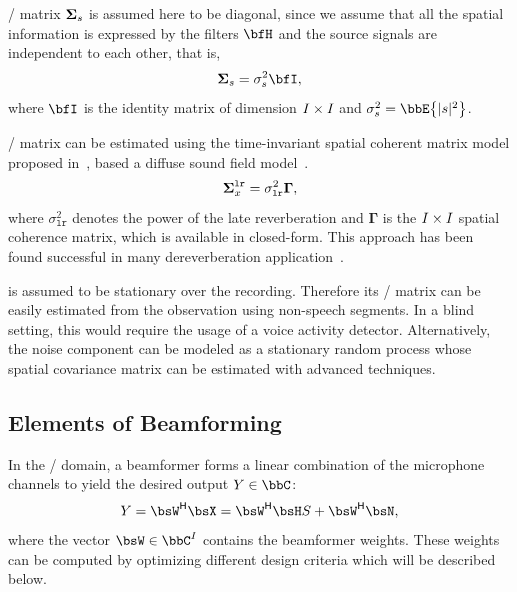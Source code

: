  \PSD/ matrix $\boldsymbol{\Sigma}_{s}$ is assumed here to be diagonal, since we assume that all the spatial information is expressed by the filters $\FLTSS$ and the source signals are independent to each other, that is,
\begin{equation}
    \xpsd_\src = \sigma_\src^2 \bfI
    ,
\end{equation}
where $\bfI$ is the identity matrix of dimension $I \times I$ and $\sigma_\src^2 = \bbE\kbrace{\powerOf{\src}}$.

 \PSD/ matrix can be estimated using the time-invariant spatial coherent matrix model proposed in~, based a diffuse sound field model~.
\begin{equation}\label{eq:dechorateapp:gamma}
    \boldsymbol{\Sigma}^{\mathtt{lr}}_{x} = \sigma_\mathtt{lr}^2\mathbf{\Gamma}
    ,
\end{equation}
where $\sigma_\mathtt{lr}^2$ denotes the power of the late reverberation and $\mathbf{\Gamma}$ is the $I \times I$ spatial coherence matrix, which is available in closed-form.
This approach has been found successful in many dereverberation application~.

 is assumed to be stationary over the recording.
Therefore its \PSD/ matrix can be easily estimated from the observation using non-speech segments.
In a blind setting, this would require the usage of a voice activity detector.
Alternatively, the noise component can be modeled as a stationary random process whose spatial covariance matrix can be estimated with advanced techniques.

\subsection{Elements of Beamforming}\label{subsec:dechorateapp:beamformers}
In the \STFT/ domain, a beamformer forms a linear combination of the microphone channels to yield the desired output $Y \in \bbC$:
\begin{equation*}
    Y = \khermitian{\bsW} \MICS = \khermitian{\bsW} \FLTS \SRC + \khermitian{\bsW} \NSES,
\end{equation*}
where the vector $\bsW \in \bbC^{\numMics}$ contains the beamformer weights.
These weights can be computed by optimizing different design criteria which will be described below.


